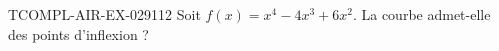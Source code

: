\begin{exercice}{TCOMPL-AIR-EX-029}{1}{12}
Soit $f(x) = x^4 - 4x^3 + 6x^2$. La courbe admet-elle des points d'inflexion ?

\end{exercice}
